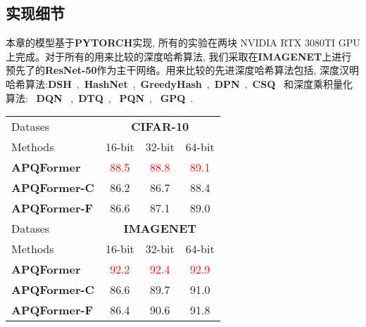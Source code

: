 \subsection{实现细节}
本章的模型基于\textbf{PYTORCH}实现, 所有的实验在两块 NVIDIA RTX 3080TI GPU上完成。对于所有的用来比较的深度哈希算法, 我们采取在\textbf{IMAGENET}上进行预先了的\textbf{ResNet-50}作为主干网络。用来比较的先进深度哈希算法包括, 深度汉明哈希算法:\textbf{DSH}~\cite{liu2016deep},~\textbf{HashNet}~\cite{cao2017deep},~\textbf{GreedyHash}~\cite{su2018greedy},~\textbf{DPN}~\cite{fan2020deep},~\textbf{CSQ}~\cite{yuan2020central} 和深度乘积量化算法: ~\textbf{DQN}~\cite{yue2016deep} ,~\textbf{DTQ}~\cite{liu2018deep}, ~\textbf{PQN}~\cite{yu2018product}, ~\textbf{GPQ}~\cite{jang2020generalized}. \par

\begin{table}[!htpb]
    \centering
    \begin{tabular}{cccccc}
       \\ \hline
    \multicolumn{3}{l|}{Datases} & \multicolumn{3}{c}{\textbf{CIFAR-10}} \\
    \multicolumn{3}{l|}{Methods} & 16-bit & 32-bit & 64-bit   \\\hline
    \hline
    \multicolumn{3}{l|}{\textbf{APQFormer}} & \textcolor{red}{88.5} & \textcolor{red}{88.8} &  \textcolor{red}{89.1}  \\
    \multicolumn{3}{l|}{\textbf{APQFormer-C}} & 86.2 &  86.7 &   88.4  \\
    \multicolumn{3}{l|}{\textbf{APQFormer-F}} & 86.6 & 87.1 &  89.0  \\
    \hline
    \hline 
    \multicolumn{3}{l|}{Datases} & \multicolumn{3}{c}{\textbf{IMAGENET}} \\
    \multicolumn{3}{l|}{Methods} & 16-bit & 32-bit  & 64-bit   \\\hline
    \hline
    \multicolumn{3}{l|}{\textbf{APQFormer}} & \textcolor{red}{92.2} & \textcolor{red}{92.4} &  \textcolor{red}{92.9}  \\
    \multicolumn{3}{l|}{\textbf{APQFormer-C}} & 86.6 & 89.7 &  91.0  \\
    \multicolumn{3}{l|}{\textbf{APQFormer-F}} & 86.4 & 90.6 &  91.8  \\
    \hline
    \hline 
    \end{tabular}
    \label{table:abdtq}
  \end{table}




